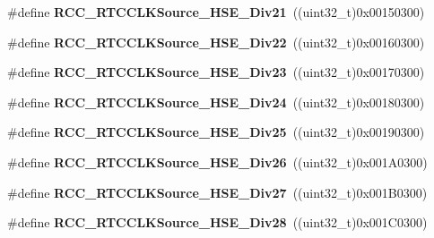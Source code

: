\begin{DoxyCompactItemize}
\#define {\bfseries R\+C\+C\+\_\+\+R\+T\+C\+C\+L\+K\+Source\+\_\+\+H\+S\+E\+\_\+\+Div21}~((uint32\+\_\+t)0x00150300)
\item 
\mbox{\label{group___r_c_c___r_t_c___clock___source_gad73953ea82b2d088763a2f6a73ef3eb9}} 
\#define {\bfseries R\+C\+C\+\_\+\+R\+T\+C\+C\+L\+K\+Source\+\_\+\+H\+S\+E\+\_\+\+Div22}~((uint32\+\_\+t)0x00160300)
\item 
\mbox{\label{group___r_c_c___r_t_c___clock___source_gaa36a87dd3f1705379438944478db99c9}} 
\#define {\bfseries R\+C\+C\+\_\+\+R\+T\+C\+C\+L\+K\+Source\+\_\+\+H\+S\+E\+\_\+\+Div23}~((uint32\+\_\+t)0x00170300)
\item 
\mbox{\label{group___r_c_c___r_t_c___clock___source_ga184ec0ec3879d6350980be7d1edd9c68}} 
\#define {\bfseries R\+C\+C\+\_\+\+R\+T\+C\+C\+L\+K\+Source\+\_\+\+H\+S\+E\+\_\+\+Div24}~((uint32\+\_\+t)0x00180300)
\item 
\mbox{\label{group___r_c_c___r_t_c___clock___source_gacab9e1957c56e0cff2b2eb082691796f}} 
\#define {\bfseries R\+C\+C\+\_\+\+R\+T\+C\+C\+L\+K\+Source\+\_\+\+H\+S\+E\+\_\+\+Div25}~((uint32\+\_\+t)0x00190300)
\item 
\mbox{\label{group___r_c_c___r_t_c___clock___source_ga537ba53795a13e55675a221f9e2e6eb9}} 
\#define {\bfseries R\+C\+C\+\_\+\+R\+T\+C\+C\+L\+K\+Source\+\_\+\+H\+S\+E\+\_\+\+Div26}~((uint32\+\_\+t)0x001\+A0300)
\item 
\mbox{\label{group___r_c_c___r_t_c___clock___source_gaaf76095713f66ecc4e7a8c8da29eea17}} 
\#define {\bfseries R\+C\+C\+\_\+\+R\+T\+C\+C\+L\+K\+Source\+\_\+\+H\+S\+E\+\_\+\+Div27}~((uint32\+\_\+t)0x001\+B0300)
\item 
\mbox{\label{group___r_c_c___r_t_c___clock___source_gab88a03b8a8333d854fa14d72d9c2fb5e}} 
\#define {\bfseries R\+C\+C\+\_\+\+R\+T\+C\+C\+L\+K\+Source\+\_\+\+H\+S\+E\+\_\+\+Div28}~((uint32\+\_\+t)0x001\+C0300)
\item 
\mbox{\label{group___r_c_c___r_t_c___clock___source_gafab743da30ce0006d62d7f55bd13f82f}} 

\end{DoxyCompactItemize}
